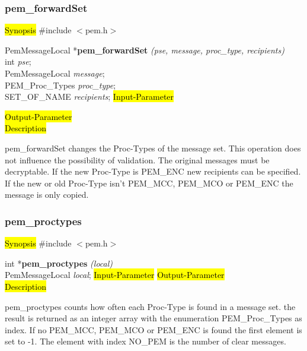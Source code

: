 \subsubsection{pem\_forwardSet}
\label{pem_forwardSet}
\hl{Synopsis}
\#include $<$pem.h$>$ 

PemMessageLocal *{\bf pem\_forwardSet} {\em (pse, message, proc\_type, recipients)} \\
int {\em pse};\\
PemMessageLocal {\em *message};\\
PEM\_Proc\_Types {\em proc\_type};\\
SET\_OF\_NAME {\em *recipients};
\hl{Input-Parameter}



\hl{Output-Parameter}
 \\
\hl{Description}

pem\_forwardSet changes the  Proc-Types of the message set. 
This operation does not influence the possibility of validation.
The original messages must be decryptable.
If the new Proc-Type is PEM\_ENC new recipients can be specified.
If the new or old
Proc-Type isn't PEM\_MCC, PEM\_MCO or PEM\_ENC the message is only copied.







\subsubsection{pem\_proctypes}
\label{pem_proctypes}
\hl{Synopsis}
\#include $<$pem.h$>$ 

int *{\bf pem\_proctypes} {\em (local)} \\
PemMessageLocal {\em *local};
\hl{Input-Parameter}
\hl{Output-Parameter}
 \\
\hl{Description}

pem\_proctypes counts how often each Proc-Type is found in a message set. 
the result is returned as an integer array with the enumeration PEM\_Proc\_Types
as index. If no PEM\_MCC, PEM\_MCO or PEM\_ENC is found the first element is set to 
-1. The element with index NO\_PEM is the number of clear messages.






